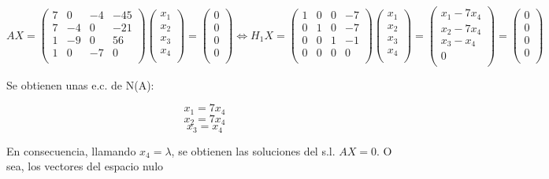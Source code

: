 \documentclass[11pt, a4paper]{article}
\newif\IfInSansMode
\theoremstyle{theorem-style}
\theoremstyle{definition-style}
\theoremstyle{remark-style}
\theoremstyle{example-style}
\begin{document}
$$AX = \begin{pmatrix}
7 & 0 & -4 & -45 \\
7 & -4 & 0 & -21 \\
1 & -9 & 0 & 56 \\
1 & 0 & -7 & 0 \\
\end{pmatrix}
\begin{pmatrix}
x_1  \\
x_2  \\
x_3  \\
x_4  \\
\end{pmatrix} = 
\begin{pmatrix}
0  \\
0  \\
0  \\
0 \\
\end{pmatrix} \Leftrightarrow H_1X =
\begin{pmatrix}
1 & 0 & 0 & -7 \\
0 & 1 & 0 & -7 \\
0 & 0 & 1 & -1 \\
0 & 0 & 0 & 0 \\
\end{pmatrix}
\begin{pmatrix}
x_1  \\
x_2  \\
x_3  \\
x_4  \\
\end{pmatrix} =
\begin{pmatrix}
x_1 - 7x_4 \\
x_2 - 7x_4 \\
x_3 - x_4 \\
0  \\
\end{pmatrix} =
\begin{pmatrix}
0  \\
0  \\
0  \\
0 \\
\end{pmatrix}$$

Se obtienen unas e.c. de N(A):

$$x_1 = 7x_4 $$
$$x_2 = 7x_4 $$
$$x_3 = x_4 $$

En consecuencia, llamando $x_4 = \lambda$, se obtienen las soluciones del s.l. $AX=0$. O sea, los vectores del espacio nulo
\end{document}
